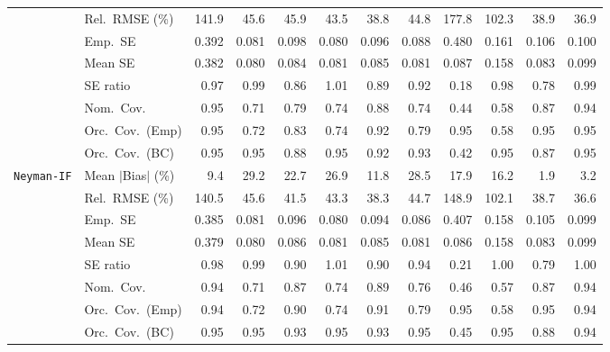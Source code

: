 \begin{landscape}
\begin{longtable}{llrrrrrrrrrr}
 & Rel.\ RMSE (\%) & 141.9 & 45.6 & 45.9 & 43.5 & \cellcolor{ranktwo}38.8 & 44.8 & 177.8 & 102.3 & \cellcolor{rankthree}38.9 & \cellcolor{rankone}36.9 \\
 & Emp.\ SE & 0.392 & 0.081 & 0.098 & 0.080 & 0.096 & 0.088 & 0.480 & 0.161 & 0.106 & 0.100 \\
 & Mean SE & 0.382 & 0.080 & 0.084 & 0.081 & 0.085 & 0.081 & 0.087 & 0.158 & 0.083 & 0.099 \\
 & SE ratio & 0.97 & \cellcolor{ranktwo}0.99 & 0.86 & \cellcolor{rankthree}1.01 & 0.89 & 0.92 & 0.18 & 0.98 & 0.78 & \cellcolor{rankone}0.99 \\
 & Nom.\ Cov. & \cellcolor{rankone}0.95 & 0.71 & 0.79 & 0.74 & \cellcolor{rankthree}0.88 & 0.74 & 0.44 & 0.58 & 0.87 & \cellcolor{ranktwo}0.94 \\
 & Orc.\ Cov.\ (Emp) & \cellcolor{rankone}0.95 & 0.72 & 0.83 & 0.74 & 0.92 & 0.79 & \cellcolor{ranktwo}0.95 & 0.58 & \cellcolor{rankthree}0.95 & 0.95 \\
 & Orc.\ Cov.\ (BC) & \cellcolor{ranktwo}0.95 & \cellcolor{rankone}0.95 & 0.88 & 0.95 & 0.92 & 0.93 & 0.42 & \cellcolor{rankthree}0.95 & 0.87 & 0.95 \\
\addlinespace[2pt]
\quad \texttt{Neyman-IF} & Mean $|$Bias$|$ (\%) & \cellcolor{rankthree}9.4 & 29.2 & 22.7 & 26.9 & 11.8 & 28.5 & 17.9 & 16.2 & \cellcolor{rankone}1.9 & \cellcolor{ranktwo}3.2 \\
 & Rel.\ RMSE (\%) & 140.5 & 45.6 & 41.5 & 43.3 & \cellcolor{ranktwo}38.3 & 44.7 & 148.9 & 102.1 & \cellcolor{rankthree}38.7 & \cellcolor{rankone}36.6 \\
 & Emp.\ SE & 0.385 & 0.081 & 0.096 & 0.080 & 0.094 & 0.086 & 0.407 & 0.158 & 0.105 & 0.099 \\
 & Mean SE & 0.379 & 0.080 & 0.086 & 0.081 & 0.085 & 0.081 & 0.086 & 0.158 & 0.083 & 0.099 \\
 & SE ratio & 0.98 & \cellcolor{rankthree}0.99 & 0.90 & 1.01 & 0.90 & 0.94 & 0.21 & \cellcolor{rankone}1.00 & 0.79 & \cellcolor{ranktwo}1.00 \\
 & Nom.\ Cov. & \cellcolor{rankone}0.94 & 0.71 & 0.87 & 0.74 & \cellcolor{rankthree}0.89 & 0.76 & 0.46 & 0.57 & 0.87 & \cellcolor{ranktwo}0.94 \\
 & Orc.\ Cov.\ (Emp) & \cellcolor{rankthree}0.94 & 0.72 & 0.90 & 0.74 & 0.91 & 0.79 & \cellcolor{ranktwo}0.95 & 0.58 & \cellcolor{rankone}0.95 & 0.94 \\
 & Orc.\ Cov.\ (BC) & \cellcolor{ranktwo}0.95 & \cellcolor{rankone}0.95 & 0.93 & \cellcolor{rankthree}0.95 & 0.93 & 0.95 & 0.45 & 0.95 & 0.88 & 0.94 \\

\end{longtable}
\end{landscape}
